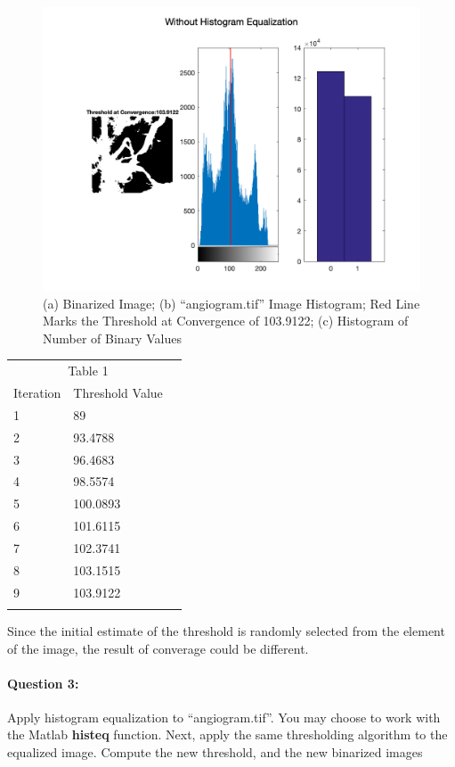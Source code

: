 \documentclass[12pt, letter]{article}
\begin{document}
\begin{figure}
    \centering
    \includegraphics[width=14cm]{without-histogram-equalization.png}
    \caption{(a) Binarized Image; (b)  ``angiogram.tif'' Image Histogram; Red Line Marks the Threshold at Convergence of 103.9122; (c) Histogram of Number of Binary Values}
    \label{fig:q2-1}
\end{figure}

\begin{center}
\begin{tabular}{llr}  
\toprule
\multicolumn{2}{c}{Table 1} \\
\cmidrule(r){1-2}
Iteration   & Threshold Value \\
\midrule
1      & 89 \\
2 & 93.4788 \\
3  & 96.4683 \\
4     & 98.5574 \\
5 & 100.0893 \\
6 & 101.6115 \\
7 & 102.3741 \\
8 & 103.1515 \\
9 & 103.9122 \\
\bottomrule
\label{table:q2-1}
\end{tabular}    
\end{center}

Since the initial estimate of the threshold is randomly selected from the element of the image, the result of converage could be different. 

\paragraph{Question 3:} Apply histogram equalization to ``angiogram.tif''. You may choose to work with the Matlab \textbf{histeq} function. Next, apply the same thresholding algorithm to the equalized image. Compute the new threshold, and the new binarized images
\end{document}
